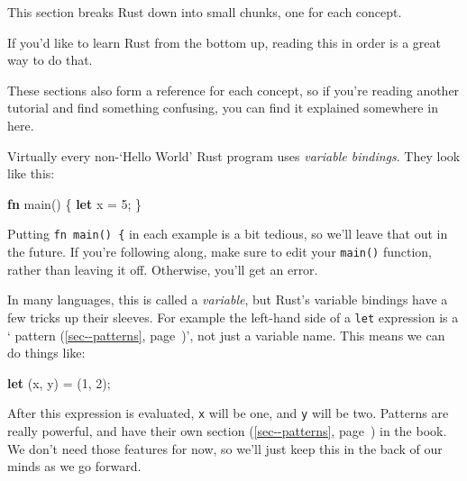 \documentclass[a4paper,]{book}
\renewcommand*{\hyperref}[2][\ar]{%
  \def\ar{#2}%
  #2 (\autoref{#1}, page~\pageref{#1})}
\newenvironment{Shaded}{\begin{snugshade}}{\end{snugshade}}
\newcommand{\KeywordTok}[1]{\textcolor[rgb]{0.13,0.29,0.53}{\textbf{{#1}}}}
\newcommand{\DecValTok}[1]{\textcolor[rgb]{0.00,0.00,0.81}{{#1}}}
\newcommand{\NormalTok}[1]{{#1}}
\begin{document}

This section breaks Rust down into small chunks, one for each concept.

If you'd like to learn Rust from the bottom up, reading this in order is
a great way to do that.

These sections also form a reference for each concept, so if you're
reading another tutorial and find something confusing, you can find it
explained somewhere in here.


Virtually every non-`Hello World' Rust program uses \emph{variable
bindings}. They look like this:

\begin{Shaded}
\begin{Highlighting}[]
\KeywordTok{fn} \NormalTok{main() \{}
    \KeywordTok{let} \NormalTok{x = }\DecValTok{5}\NormalTok{;}
\NormalTok{\}}
\end{Highlighting}
\end{Shaded}

Putting \texttt{fn\ main()\ \{} in each example is a bit tedious, so
we'll leave that out in the future. If you're following along, make sure
to edit your \texttt{main()} function, rather than leaving it off.
Otherwise, you'll get an error.

In many languages, this is called a \emph{variable}, but Rust's variable
bindings have a few tricks up their sleeves. For example the left-hand
side of a \texttt{let} expression is a
`\hyperref[sec--patterns]{pattern}', not just a variable name. This
means we can do things like:

\begin{Shaded}
\begin{Highlighting}[]
\KeywordTok{let} \NormalTok{(x, y) = (}\DecValTok{1}\NormalTok{, }\DecValTok{2}\NormalTok{);}
\end{Highlighting}
\end{Shaded}

After this expression is evaluated, \texttt{x} will be one, and
\texttt{y} will be two. Patterns are really powerful, and have
\hyperref[sec--patterns]{their own section} in the book. We don't need
those features for now, so we'll just keep this in the back of our minds
as we go forward.
\end{document}
